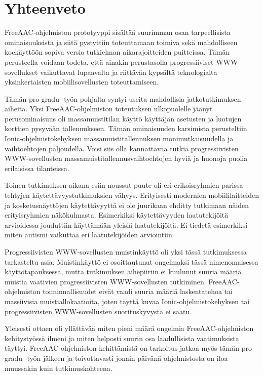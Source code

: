 \documentclass[utf8]{gradu3}
\begin{document}
\chapter{Yhteenveto}

FreeAAC-ohjelmiston prototyyppi sisältää suurimman osan tarpeellisista ominaisuuksista ja siitä pystyttiin toteuttamaan toimiva sekä mahdolliseen koekäyttöön sopiva versio tutkielman aikarajoitteiden puitteissa. Tämän perusteella voidaan todeta, että ainakin perustasolla progressiiviset WWW-sovellukset vaikuttavat lupaavalta ja riittävän kypsältä teknologialta yksinkertaisten mobiilisovellusten toteuttamiseen.

Tämän pro gradu -työn pohjalta syntyi useita mahdollisia jatkotutkimuksen aiheita. Yksi FreeAAC-ohjelmiston toteutuksen ulkopuolelle jäänyt perusominaisuus oli massamuistitilan käyttö käyttäjän asetusten ja luotujen korttien pysyvään tallennukseen. Tämän ominaisuuden karsimista perusteltiin Ionic-ohjelmistokehyksen massamuistitallennuksen monimutkaisuudella ja vaihtoehtojen paljoudella. Voisi siis olla kannattavaa tutkia progressiivisten WWW-sovellusten massamuistitallennusvaihtoehtojen hyviä ja huonoja puolia erilaisissa tilanteissa.

Toinen tutkimuksen aikana esiin noussut puute oli eri erikoisryhmien parissa tehtyjen käytettävyystutkimuksien vähyys. Erityisesti modernien mobiililaitteiden ja kosketusnäyttöjen käytettävyyttä ei ole juurikaan ehditty tutkimaan näiden erityisryhmien näkökulmasta. Esimerkiksi käytettävyyden laatutekijöitä arvioidessa jouduttiin käyttämään yleisiä laatutekijöitä. Ei tiedetä esimerkiksi miten autismi vaikuttaa eri laatutekijöiden arviointiin.

Progressiivisten WWW-sovellusten muistinkäyttö oli yksi tässä tutkimuksessa tarkasteltu asia. Muistinkäyttö ei osoittautunut ongelmaksi tässä nimenomaisessa käyttötapauksessa, mutta tutkimuksen aihepiiriin ei kuulunut suuria määriä muistia vaativien progressiivisten WWW-sovellusten tutkiminen. FreeAAC-ohjelmiston toiminnallisuudet eivät vaadi suuria määriä laskentatehoa tai massiivisia muistiallokaatioita, joten täyttä kuvaa Ionic-ohjelmistokehyksen tai progressiivisten WWW-sovellusten suorituskyvystä ei saatu.

Yleisesti ottaen oli yllättävää miten pieni määrä ongelmia FreeAAC-ohjelmiston kehitystyössä ilmeni ja miten helposti suurin osa laadullisista vaatimuksista täyttyi. FreeAAC-ohjelmiston kehittämistä on tarkoitus jatkaa myös tämän pro gradu -työn jälkeen ja toivottavasti jonain päivänä ohjelmistosta on iloa muussakin kuin tutkimuskohteena.
\end{document}
